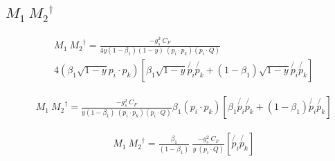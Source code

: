 \subsection*{$ M_1\: {M_2}^{\dagger} $}


\begin{equation}
\begin{split}
&M_1\: {M_2}^{\dagger} = \frac{-g_s^2\: C_F }{4y(1-\beta_1) (1-y)\:(p_i \cdot p_k)(p_i \cdot Q)} \\
&4(\beta_1 \sqrt{1-y}{p_i}\cdot {{p_k}})[\beta_1 \sqrt{1-y}\not{p_i} \not{p_k}+ (1-\beta_1) \sqrt{1-y}\not{p_i}\not{p_k}]
\end{split}
\end{equation}

\begin{equation}
\begin{split}
&M_1\: {M_2}^{\dagger} = \frac{-g_s^2\: C_F }{y(1-\beta_1) \:(p_i \cdot p_k)(p_i \cdot Q)} \beta_1( {p_i}\cdot {{p_k}})[\beta_1 \not{p_i} \not{p_k}+ (1-\beta_1) \not{p_i}\not{p_k}]
\end{split}
\end{equation}

\begin{equation}
\begin{split}
&M_1\: {M_2}^{\dagger} = \frac{\beta_1}{(1-\beta_1)}\: \frac{-g_s^2\: C_F }{y \:(p_i \cdot Q)} [\not{p_i} \not{p_k}]
\end{split}
\end{equation}
\newpage
